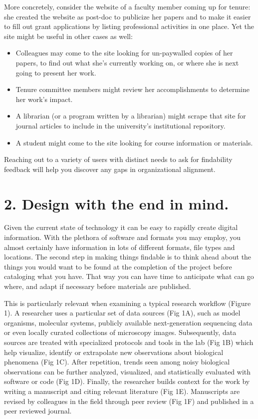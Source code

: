 \documentclass[10pt,letterpaper]{article}
\newcommand{\rulemajor}[1]{\section*{#1}}
\begin{document}
More concretely, consider the website of a faculty member coming up for tenure:
she created the website as post-doc to publicize her papers and to make it
easier to fill out grant applications by listing professional activities in one
place.  Yet the site might be useful in other cases as well:

\begin{itemize}

\item
  Colleagues may come to the site looking for un-paywalled copies of her
  papers, to find out what she's currently working on, or where she is next
  going to present her work.

\item
  Tenure committee members might review her accomplishments to determine her
  work's impact.

\item
  A librarian (or a program written by a librarian) might scrape that site for
  journal articles to include in the university's institutional repository.

\item
  A student might come to the site looking for course information or materials.

\end{itemize}

Reaching out to a variety of users with distinct needs to ask for findability feedback will
help you discover any gaps in organizational alignment.

\rulemajor{2. Design with the end in mind.}

Given the current state of technology it can be easy to rapidly create digital
information. With the plethora of software and formats you may employ, you almost
certainly have information in lots of different formats, file types and locations.
The second step in making things findable is to think ahead about the things you
would want to be found at the completion of the project before cataloging what you
have. That way you can have time to anticipate what can go where, and adapt if
necessary before materials are published. 

This is particularly relevant when examining a typical research workflow (Figure 1). A researcher uses a particular set of 
data sources (Fig 1A), such as model organisms, molecular systems, publicly 
available next-generation sequencing data or even locally curated collections of microscopy images.
Subsequently, data sources are treated with specialized protocols and tools in the lab (Fig 1B) which help visualize, 
identify or extrapolate new observations about biological phenomena (Fig 1C). After repetition, 
trends seen among noisy biological observations can be further analyzed, visualized, and 
statistically evaluated with software or code (Fig 1D). Finally, the researcher builds context
for the work by writing a manuscript and citing relevant literature (Fig 1E). Manuscripts are revised
by colleagues in the field through peer review (Fig 1F) and published in a peer reviewed journal.
\end{document}

